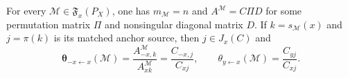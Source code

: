 For every \(\mathcal M\in\mathfrak F_x(P_X)\), one has \(m_{\mathcal M}=n\) and \(A^{\mathcal M}=C\Pi D\) for some permutation matrix \(\Pi\) and nonsingular diagonal matrix \(D\). If \(k=s_{\mathcal M}(x)\) and \(j=\pi(k)\) is its matched anchor source, then \(j\in J_x(C)\) and
\[
 \boldsymbol\theta_{-x\leftarrow x}(\mathcal M)
 =\frac{A^{\mathcal M}_{-x,k}}{A^{\mathcal M}_{xk}}
 =\frac{C_{-x,j}}{C_{xj}},
 \qquad
 \theta_{y\leftarrow x}(\mathcal M)=\frac{C_{yj}}{C_{xj}}.
\]